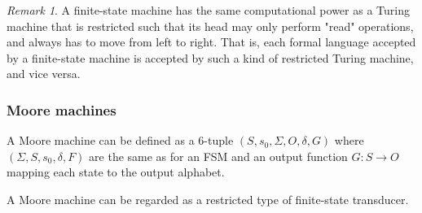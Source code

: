 \documentclass{scrartcl}
\theoremstyle{definition}
\theoremstyle{remark}
\newtheorem{remark}{Remark}
\begin{document}
\begin{remark}
A finite-state machine has the same computational power as a Turing machine that is restricted such that its head may only perform "read" operations, and always has to move from left to right. That is, each formal language accepted by a finite-state machine is accepted by such a kind of restricted Turing machine, and vice versa.
\end{remark}


\subsubsection{Moore machines}%

A Moore machine can be defined as a 6-tuple  $(S,s_{0},\Sigma ,O,\delta ,G)$ where $(\Sigma ,S,s_{0},\delta ,F)$ are the same as for an FSM and 
an output function $G:S\rightarrow O$ mapping each state to the output alphabet.



A Moore machine can be regarded as a restricted type of finite-state transducer.









 \newpage
 
 
\end{document}
